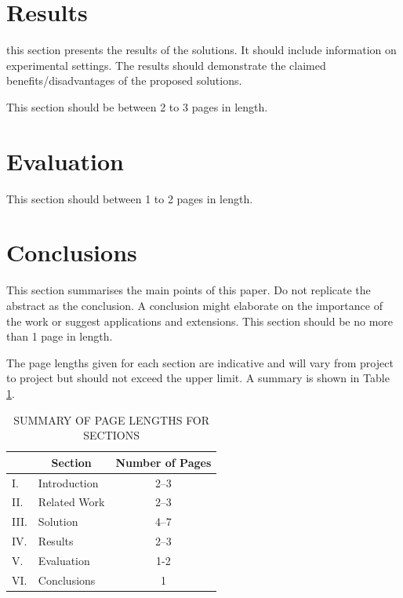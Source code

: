 \documentclass[12pt,a4paper]{article}\usepackage[]{graphicx}\usepackage[]{color}
\begin{document}
\section{Results}

this section presents the results of the solutions.  It should include information on experimental settings.  The results should demonstrate the claimed benefits/disadvantages of the proposed solutions.

This section should be between 2 to 3 pages in length.

\section{Evaluation}

This section should between 1 to 2 pages in length.

\section{Conclusions}

This section summarises the main points of this paper.  Do not replicate the abstract as the conclusion.  A conclusion might elaborate on the importance of the work or suggest applications and extensions.  This section should be no more than 1 page in length.

The page lengths given for each section are indicative and will vary from project to project but should not exceed the upper limit.  A summary is shown in Table \ref{summary}.

\begin{table}[htb]
\centering
\caption{SUMMARY OF PAGE LENGTHS FOR SECTIONS}
\vspace*{6pt}
\label{summary}
\begin{tabular}{|ll|c|} \hline
& \multicolumn{1}{c|}{\bf Section} & {\bf Number of Pages} \\ \hline
I. & Introduction & 2--3 \\ \hline
II. & Related Work & 2--3 \\ \hline
III. & Solution & 4--7 \\ \hline
IV. & Results & 2--3 \\ \hline
V. & Evaluation & 1-2 \\ \hline
VI. & Conclusions & 1 \\ \hline
\end{tabular}
\end{table}



\end{document}
